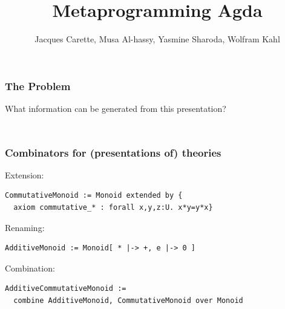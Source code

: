 \documentclass{beamer}
\title[Metaprogramming Agda]{Metaprogramming Agda}
\author[Carette, Al-hassy, Sharoda, Kahl]
  {\Large Jacques Carette, Musa Al-hassy, Yasmine Sharoda, Wolfram Kahl}
\institute[McMaster]{McMaster University}
\begin{document}
\begin{frame}
\thispagestyle{empty}
\titlepage
\end{frame}


\begin{frame}
\frametitle{The Problem}
What information can be generated from this presentation?
\begin{columns}
  \hspace*{-2cm}
  \begin{column}{0.5\textwidth} 
    {\tiny {} }
  \end{column}
  \hspace*{-2cm}
  \begin{column}{0.5\textwidth}
    {\vspace*{\fill}}
  \end{column}
\end{columns}
\end{frame}

\begin{frame}[t,fragile]
\frametitle{Combinators for (presentations of) theories}
Extension:
\begin{lstlisting}
CommutativeMonoid := Monoid extended by {
  axiom commutative_* : forall x,y,z:U. x*y=y*x}
\end{lstlisting}
Renaming:
\begin{lstlisting}
AdditiveMonoid := Monoid[ * |-> +, e |-> 0 ]
\end{lstlisting}
Combination:
\begin{lstlisting}
AdditiveCommutativeMonoid := 
  combine AdditiveMonoid, CommutativeMonoid over Monoid
\end{lstlisting}
\end{frame}
\end{document}

